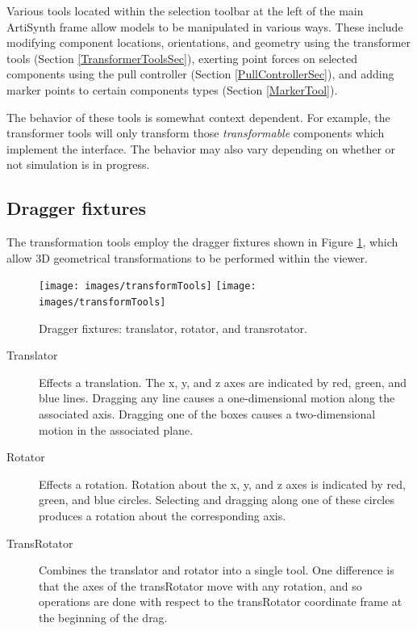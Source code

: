 \documentclass{article}
\begin{document}
Various tools located within the selection toolbar at the left of the
main ArtiSynth frame allow models to be manipulated in various ways.
These include modifying component locations, orientations, and
geometry using the transformer tools (Section
\ref{TransformerToolsSec}), exerting point forces on selected
components using the pull controller (Section
\ref{PullControllerSec}), and adding marker points to certain
components types (Section \ref{MarkerTool}).

The behavior of these tools is somewhat context dependent.  For
example, the transformer tools will only transform those {\it
transformable} components which implement the
interface. The behavior may also vary depending on whether or not
simulation is in progress.

\subsection{Dragger fixtures}
\label{draggerFixturesSec}

The transformation tools employ the dragger fixtures shown
in Figure \ref{transformToolsFig}, which allow 3D geometrical
transformations to be performed within the viewer.

\begin{figure}
\begin{center}
\iflatexml
\texttt{[image: images/transformTools]}
\else
\texttt{[image: images/transformTools]}
\fi
\end{center}
\caption{Dragger fixtures: translator, rotator, and transrotator.}%
\label{transformToolsFig}
\end{figure}

\begin{description}

\item[Translator]\mbox{}

Effects a translation. The x, y, and z axes are
indicated by red, green, and blue lines. Dragging any line causes
a one-dimensional motion along the associated axis. Dragging one
of the boxes causes a two-dimensional motion in the associated plane.

\item[Rotator]\mbox{}

Effects a rotation. Rotation about the
x, y, and z axes is indicated by red, green, and blue circles.
Selecting and dragging along one of these circles produces
a rotation about the corresponding axis.

\item[TransRotator]\mbox{}

Combines the translator and rotator into a single tool. One difference
is that the axes of the transRotator move with any rotation,
and so operations are done with respect to the transRotator coordinate frame
at the beginning of the drag.

\end{description}
\end{document}
